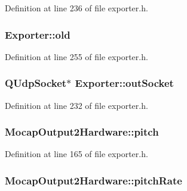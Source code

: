 Definition at line 236 of file exporter.\-h.

\hypertarget{group___mo_cap_plugin_ga5ef84da1bd9cf4e1d625c33beb5a148c}{
\subsubsection[{old}]{ Exporter\-::old\hspace{0.3cm}{\ttfamily [protected]}}}\label{group___mo_cap_plugin_ga5ef84da1bd9cf4e1d625c33beb5a148c}


Definition at line 255 of file exporter.\-h.

\hypertarget{group___mo_cap_plugin_gad4adc615f73413f479e48983cce6f3e0}{
\subsubsection[{out\-Socket}]{\setlength{\rightskip}{0pt plus 5cm}Q\-Udp\-Socket$\ast$ Exporter\-::out\-Socket\hspace{0.3cm}{\ttfamily [protected]}}}\label{group___mo_cap_plugin_gad4adc615f73413f479e48983cce6f3e0}


Definition at line 232 of file exporter.\-h.

\hypertarget{group___mo_cap_plugin_ga5e6750ec09f6ef2ebd014c746421e952}{
\subsubsection[{pitch}]{ Mocap\-Output2\-Hardware\-::pitch}}\label{group___mo_cap_plugin_ga5e6750ec09f6ef2ebd014c746421e952}


Definition at line 165 of file exporter.\-h.

\hypertarget{group___mo_cap_plugin_ga03ecf7a98f0b6197c65a71fa1e2a1237}{
\subsubsection[{pitch\-Rate}]{ Mocap\-Output2\-Hardware\-::pitch\-Rate}}\label{group___mo_cap_plugin_ga03ecf7a98f0b6197c65a71fa1e2a1237}


